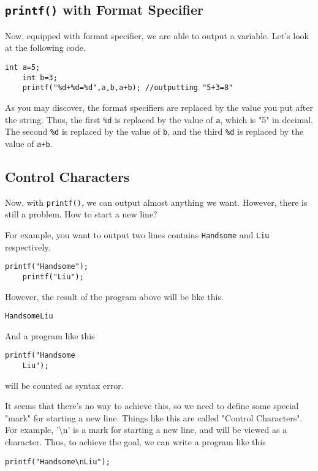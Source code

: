 \documentclass{report}
\newcommand{\bs}{\textbackslash}
\begin{document}
    \subsection{\texttt{printf()} with Format Specifier}
    Now, equipped with format specifier, we are able to output a variable. Let's look at the following code.
\begin{lstlisting}[style=CStyle]
    int a=5;
    int b=3;
    printf("%d+%d=%d",a,b,a+b); //outputting "5+3=8" 
\end{lstlisting} 
    As you may discover, the format specifiers are replaced by the value you put after the string. Thus, the first \texttt{\%d} is replaced by the value of \texttt{a}, which is "5" in decimal. The second \texttt{\%d} is replaced by the value of \texttt{b}, and the third \texttt{\%d} is replaced by the value of \texttt{a+b}.

    \subsection{Control Characters}
    Now, with \texttt{printf()}, we can output almost anything we want. However, there is still a problem. How to start a new line?

    For example, you want to output two lines contains \texttt{Handsome} and \texttt{Liu} respectively.
\begin{lstlisting}[style=CStyle]
    printf("Handsome");
    printf("Liu");
\end{lstlisting}

    However, the result of the program above will be like this.
\begin{lstlisting}[style=CLStyle]
HandsomeLiu
\end{lstlisting}
    And a program like this
\begin{lstlisting}[style=CStyle]
    printf("Handsome
    Liu");
\end{lstlisting}
    will be counted as syntax error.

    It seems that there's no way to achieve this, so we need to define some special "mark" for starting a new line. Things like this are called "Control Characters". For example, '\bs n' is a mark for starting a new line, and will be viewed as a character. Thus, to achieve the goal, we can write a program like this

\begin{lstlisting}[style=CStyle]
    printf("Handsome\nLiu");
\end{lstlisting}
\end{document}
